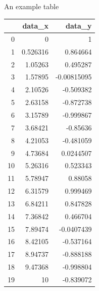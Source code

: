 \documentclass[10pt]{extarticle}\usepackage[letterpaper]{geometry}
\begin{document}
An example table
\begin{tabular}{rrr}
\hline
    &    data\_x &      data\_y \\
\hline
  0 &  0        &  1          \\
  1 &  0.526316 &  0.864664   \\
  2 &  1.05263  &  0.495287   \\
  3 &  1.57895  & -0.00815095 \\
  4 &  2.10526  & -0.509382   \\
  5 &  2.63158  & -0.872738   \\
  6 &  3.15789  & -0.999867   \\
  7 &  3.68421  & -0.85636    \\
  8 &  4.21053  & -0.481059   \\
  9 &  4.73684  &  0.0244507  \\
 10 &  5.26316  &  0.523343   \\
 11 &  5.78947  &  0.88058    \\
 12 &  6.31579  &  0.999469   \\
 13 &  6.84211  &  0.847828   \\
 14 &  7.36842  &  0.466704   \\
 15 &  7.89474  & -0.0407439  \\
 16 &  8.42105  & -0.537164   \\
 17 &  8.94737  & -0.888188   \\
 18 &  9.47368  & -0.998804   \\
 19 & 10        & -0.839072   \\
\hline
\end{tabular}
\end{document}

